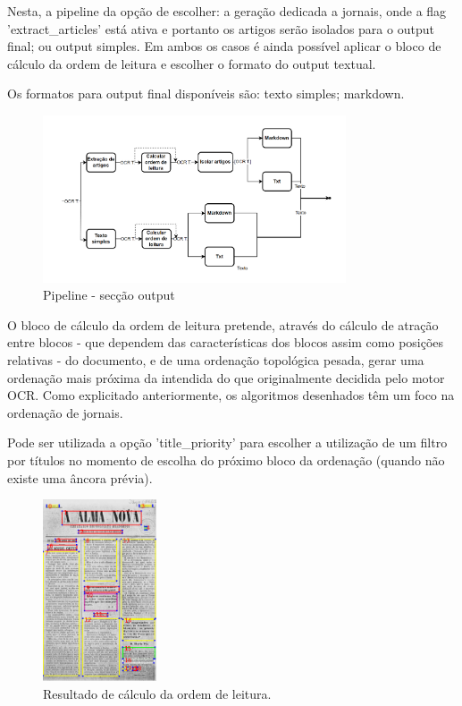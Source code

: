 Nesta, a pipeline da opção de escolher: a geração dedicada a jornais, onde a flag 'extract\_articles' está ativa e portanto os artigos serão isolados para o output final; ou output simples. Em ambos os casos é ainda possível aplicar o bloco de cálculo da ordem de leitura e escolher o formato do output textual.

Os formatos para output final disponíveis são: texto simples; markdown.

\begin{figure}[H]
	\centering
	\includegraphics[width=0.8\textwidth]{images/diagramas/arquitetura_pipeline_output.png}
	\caption{Pipeline - secção output}
	\label{fig:arquitetura_pipeline_output}
\end{figure}




O bloco de cálculo da ordem de leitura pretende, através do cálculo de atração entre blocos - que dependem das características dos blocos assim como posições relativas - do documento, e de uma ordenação topológica pesada, gerar uma ordenação mais próxima da intendida do que originalmente decidida pelo motor OCR. Como explicitado anteriormente, os algoritmos desenhados têm um foco na ordenação de jornais.

Pode ser utilizada a opção 'title\_priority' para escolher a utilização de um filtro por títulos no momento de escolha do próximo bloco da ordenação (quando não existe uma âncora prévia).


\begin{figure}[H]
	\centering
	\includegraphics[width=0.3\textwidth]{images/ilustracoes/pipeline_calculate_reading_order_example.png}
	\caption{Resultado de cálculo da ordem de leitura.}
	\label{fig:pipeline_calculate_reading_order_example}
\end{figure}

